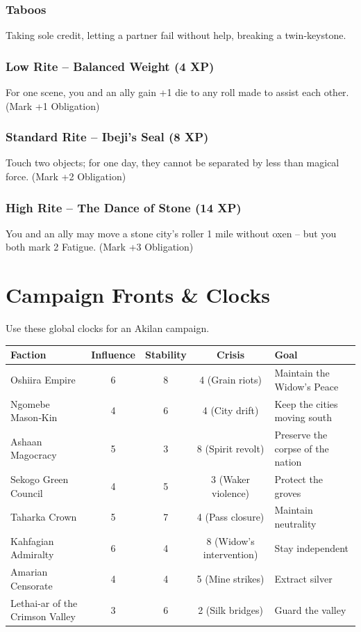\documentclass[11pt]{book}
\begin{document}
\subsection*{Taboos}
Taking sole credit, letting a partner fail without help, breaking a twin‑keystone.
\subsection*{Low Rite -- Balanced Weight (4 XP)}
For one scene, you and an ally gain +1 die to any roll made to assist each other. (Mark +1 Obligation)
\subsection*{Standard Rite -- Ibeji's Seal (8 XP)}
Touch two objects; for one day, they cannot be separated by less than magical force. (Mark +2 Obligation)
\subsection*{High Rite -- The Dance of Stone (14 XP)}
You and an ally may move a stone city's roller 1 mile without oxen -- but you both mark 2 Fatigue. (Mark +3 Obligation)

\chapter{Campaign Fronts \& Clocks}

Use these global clocks for an Akilan campaign.

\begin{tabu} to \linewidth {|X|c|c|c|X|}
\hline
\textbf{Faction} & \textbf{Influence} & \textbf{Stability} & \textbf{Crisis} & \textbf{Goal} \\
\hline
Oshiira Empire & 6 & 8 & 4 (Grain riots) & Maintain the Widow's Peace \\
Ngomebe Mason‑Kin & 4 & 6 & 4 (City drift) & Keep the cities moving south \\
Ashaan Magocracy & 5 & 3 & 8 (Spirit revolt) & Preserve the corpse of the nation \\
Sekogo Green Council & 4 & 5 & 3 (Waker violence) & Protect the groves \\
Taharka Crown & 5 & 7 & 4 (Pass closure) & Maintain neutrality \\
Kahfagian Admiralty & 6 & 4 & 8 (Widow's intervention) & Stay independent \\
Amarian Censorate & 4 & 4 & 5 (Mine strikes) & Extract silver \\
Lethai‑ar of the Crimson Valley & 3 & 6 & 2 (Silk bridges) & Guard the valley \\
\hline
\end{tabu}
\end{document}
